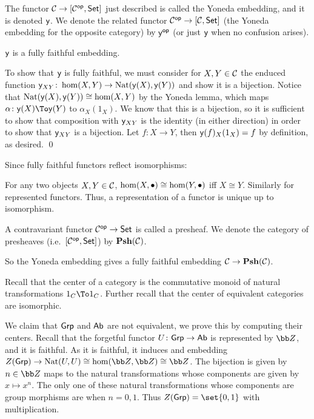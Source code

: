 \bdefn

    The functor ${{\cal C}}\to[{{\cal C}}^{\sf op},{\sf Set}]$ just described is called the {\emphcolor Yoneda embedding}, and it is denoted ${\sf y}$.
    We denote the related functor ${{\cal C}}^{\sf op}\to[{{\cal C}},{\sf Set}]$ (the Yoneda embedding for the opposite category) by ${\sf y}^{\sf op}$ (or just ${\sf y}$ when no confusion arises).

\edefn

\bprop

    ${\sf y}$ is a fully faithful embedding.

\eprop

\bproof

    To show that ${\sf y}$ is fully faithful, we must consider for $X,Y\in{{\cal C}}$ the enduced function ${\sf y}_{XY}\colon\hom(X,Y)\to{\rm Nat}({\sf y}(X),{\sf y}(Y))$ and show it is a bijection.
    Notice that ${\rm Nat}({\sf y}(X),{\sf y}(Y))\cong\hom(X,Y)$ by the Yoneda lemma, which maps $\alpha\colon\y(X)\To\y(Y)$ to $\alpha_X(1_X)$.
    We know that this is a bijection, so it is sufficient to show that composition with ${\sf y}_{XY}$ is the identity (in either direction) in order to show that ${\sf y}_{XY}$ is a bijection.
    Let $f\colon X\to Y$, then ${\sf y}(f)_X(1_X)=f$ by definition, as desired.
    \qed

\eproof

Since fully faithful functors reflect isomorphisms:

\bprop

    For any two objects $X,Y\in{{\cal C}}$, $\hom(X,\bullet)\cong\hom(Y,\bullet)$ iff $X\cong Y$.
    Similarly for represented functors.
    Thus, a representation of a functor is unique up to isomorphism.

\eprop

\bdefn

    A contravariant functor ${{\cal C}}^{\sf op}\to{\sf Set}$ is called a {\emphcolor presheaf}.
    We denote the category of presheaves (i.e.\ $[{{\cal C}}^{\sf op},{\sf Set}]$) by ${\bf Psh}({{\cal C}})$.

\edefn

So the Yoneda embedding gives a fully faithful embedding ${{\cal C}}\to{\bf Psh}({{\cal C}})$.

Recall that the center of a category is the commutative monoid of natural transformations $1_C\To1_C$.
Further recall that the center of equivalent categories are isomorphic.

\bexam

    We claim that ${\sf Grp}$ and ${\sf Ab}$ are not equivalent, we prove this by computing their centers.
    Recall that the forgetful functor $U\colon{\sf Grp}\to{\sf Ab}$ is represented by $\bZ$, and it is faithful.
    As it is faithful, it induces and embedding $Z(\grp)\to\nat(U,U)\cong\hom(\bZ,\bZ)\cong\bZ$.
    The bijection is given by $n\in\bZ$ maps to the natural transformations whose components are given by $x\mapsto x^n$.
    The only one of these natural transformations whose components are group morphisms are when $n=0,1$.
    Thus $Z(\grp)=\set{0,1}$ with multiplication.

